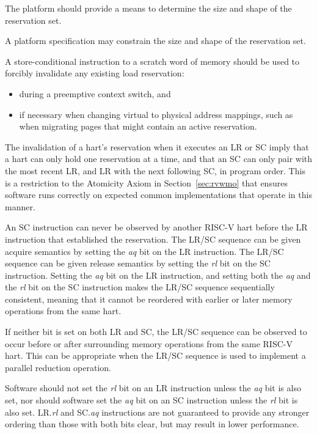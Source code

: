 \begin{commentary}
The platform should provide a means to determine the size and shape of the
reservation set.

A platform specification may constrain the size and shape of the reservation
set.
\end{commentary}

\begin{commentary}
A store-conditional instruction to a scratch word of memory should be used
to forcibly invalidate any existing load reservation:
\begin{itemize}
\item during a preemptive context switch, and
\item if necessary when changing virtual to physical address mappings,
  such as when migrating pages that might contain an active reservation.
\end{itemize}
\end{commentary}

\begin{commentary}
The invalidation of a hart's reservation when it executes an LR or SC
imply that a hart can only hold one reservation at a time, and that
an SC can only pair with the most recent LR, and LR with the next
following SC, in program order.  This is a restriction to the
Atomicity Axiom in Section~\ref{sec:rvwmo} that ensures software runs
correctly on expected common implementations that operate in this manner.
\end{commentary}

An SC instruction can never be observed by another RISC-V hart
before the LR instruction that established the reservation.
The LR/SC
sequence can be given acquire semantics by setting the {\em aq} bit on
the LR instruction.  The LR/SC sequence can be given release semantics
by setting the {\em rl} bit on the SC instruction.  Setting the {\em
  aq} bit on the LR instruction, and setting both the {\em aq} and the {\em
  rl} bit on the SC instruction makes the LR/SC sequence sequentially
consistent, meaning that it cannot be reordered with earlier or
later memory operations from the same hart.

If neither bit is set on both LR and SC, the LR/SC sequence can be
observed to occur before or after surrounding memory operations from
the same RISC-V hart.  This can be appropriate when the LR/SC
sequence is used to implement a parallel reduction operation.

Software should not set the {\em rl} bit on an LR instruction unless the {\em
aq} bit is also set, nor should software set the {\em aq} bit on an SC
instruction unless the {\em rl} bit is also set.  LR.{\em rl} and SC.{\em aq}
instructions are not guaranteed to provide any stronger ordering than those
with both bits clear, but may result in lower performance.

